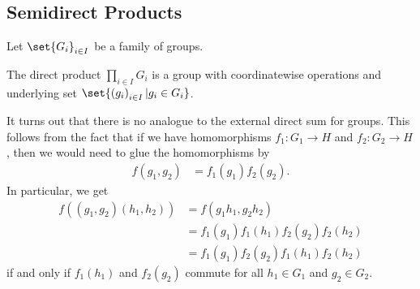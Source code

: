 \documentclass[10pt]{mypackage}
\begin{document}
\subsection{Semidirect Products}%
\begin{definition}
  Let $\set{G_i}_{i\in I}$ be a family of groups.%

  The direct product $\prod_{i\in I}G_i$ is a group with coordinatewise operations and underlying set $\set{\left( g_i \right)_{i\in I} | g_i\in G_i}$.
\end{definition}
It turns out that there is no analogue to the external direct sum for groups. This follows from the fact that if we have homomorphisms $f_1\colon G_1\rightarrow H$ and $f_2\colon G_2\rightarrow H$, then we would need to glue the homomorphisms by
\begin{align*}
  f\left( g_1,g_2 \right) &= f_1\left( g_1 \right)f_2\left( g_2 \right).
\end{align*}
In particular, we get
\begin{align*}
  f\left( \left( g_1,g_2 \right)\left( h_1,h_2 \right) \right) &= f\left( g_1h_1,g_2h_2 \right)\\
                                                               &= f_1\left( g_1 \right)f_1\left( h_1 \right)f_2\left( g_2 \right)f_2\left( h_2 \right)\\
                                                               &= f_1\left( g_1 \right)f_2\left( g_2 \right)f_1\left( h_1 \right)f_2\left( h_2 \right)
\end{align*}
if and only if $f_1\left( h_1 \right)$ and $f_2\left( g_2 \right)$ commute for all $h_1\in G_1$ and $g_2\in G_2$.%
\end{document}
